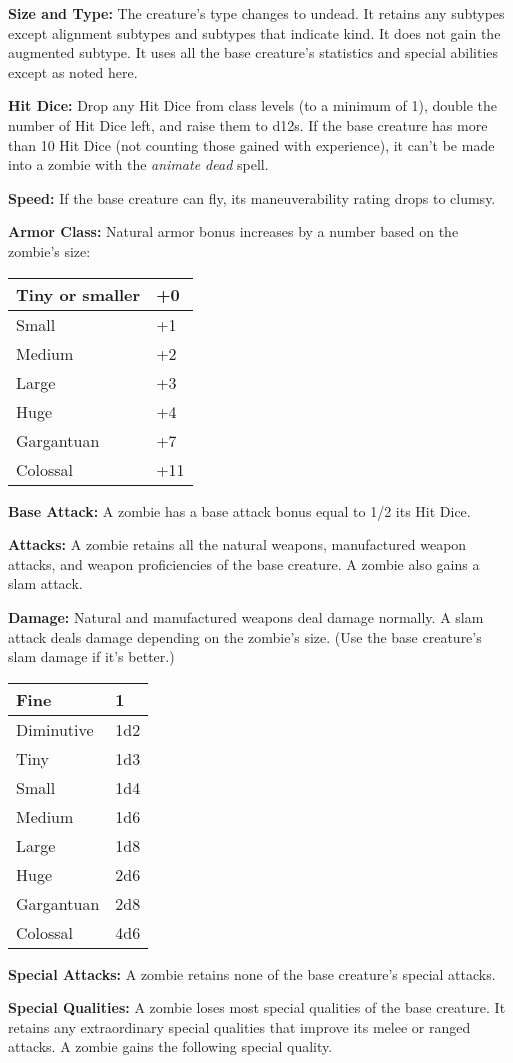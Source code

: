 \documentclass{article}
\begin{document}
\textbf{Size and Type:} The creature's type changes to undead. It retains any subtypes 
except alignment subtypes and subtypes that indicate kind. It does not gain the 
augmented subtype. It uses all the base creature's statistics and special abilities 
except as noted here.

\textbf{Hit Dice:} Drop any Hit Dice from class levels (to a minimum of 1), double 
the number of Hit Dice left, and raise them to d12s. If the base creature has more 
than 10 Hit Dice (not counting those gained with experience), it can't be made 
into a zombie with the \textit{animate dead }spell.

\textbf{Speed:} If the base creature can fly, its maneuverability rating drops 
to clumsy.

\textbf{Armor Class:} Natural armor bonus increases by a number based on the zombie's 
size:

\begin{tabular}{|>{\raggedright}p{60pt}|>{\raggedright}p{14pt}|}
\hline
Tiny or smaller & +0\tabularnewline
\hline
Small & +1\tabularnewline
\hline
Medium & +2\tabularnewline
\hline
Large & +3\tabularnewline
\hline
Huge & +4\tabularnewline
\hline
Gargantuan & +7\tabularnewline
\hline
Colossal & +11\tabularnewline
\hline
\end{tabular}

\textbf{Base Attack: }A zombie has a base attack bonus equal to 1/2 its Hit Dice.

\textbf{Attacks:} A zombie retains all the natural weapons, manufactured weapon 
attacks, and weapon proficiencies of the base creature. A zombie also gains a slam 
attack.

\textbf{Damage:} Natural and manufactured weapons deal damage normally. A slam 
attack deals damage depending on the zombie's size. (Use the base creature's slam 
damage if it's better.)

\begin{tabular}{|>{\raggedright}p{45pt}|>{\raggedright}p{13pt}|}
\hline
Fine & 1\tabularnewline
\hline
Diminutive & 1d2\tabularnewline
\hline
Tiny & 1d3\tabularnewline
\hline
Small & 1d4\tabularnewline
\hline
Medium & 1d6\tabularnewline
\hline
Large & 1d8\tabularnewline
\hline
Huge & 2d6\tabularnewline
\hline
Gargantuan & 2d8\tabularnewline
\hline
Colossal & 4d6\tabularnewline
\hline
\end{tabular}

\textbf{Special Attacks:} A zombie retains none of the base creature's special 
attacks.

\textbf{Special Qualities:} A zombie loses most special qualities of the base creature. 
It retains any extraordinary special qualities that improve its melee or ranged 
attacks. A zombie gains the following special quality.
\end{document}
